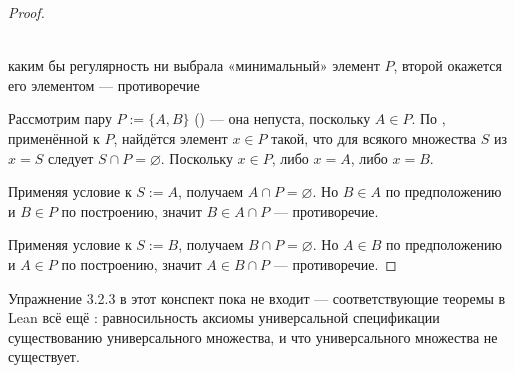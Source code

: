 \begin{proof}
\begin{intuition}
\begin{center}
\\
{\footnotesize\color{intuitiongray}каким бы регулярность ни выбрала «минимальный» элемент
$P$, второй окажется его элементом — противоречие}
\end{center}
\end{intuition}

Рассмотрим пару $P := \{A, B\}$
() — она непуста, поскольку $A \in P$. По
, применённой к $P$, найдётся элемент $x \in P$
такой, что для всякого множества $S$ из $x = S$ следует $S \cap P = \varnothing$. Поскольку
$x \in P$, либо $x = A$, либо $x = B$.

 Применяя условие к $S := A$, получаем $A \cap P = \varnothing$. Но
$B \in A$ по предположению и $B \in P$ по построению, значит $B \in A \cap P$ — противоречие.

 Применяя условие к $S := B$, получаем $B \cap P = \varnothing$. Но
$A \in B$ по предположению и $A \in P$ по построению, значит $A \in B \cap P$ — противоречие.
\end{proof}

\begin{remark}
Упражнение 3.2.3 в этот конспект пока не входит — соответствующие теоремы в Lean всё ещё
: равносильность аксиомы универсальной спецификации существованию универсального
множества, и что универсального множества не существует.
\end{remark}
